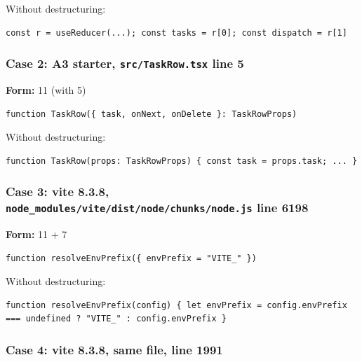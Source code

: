 \documentclass[
  11pt,
]{article}
\begin{document}
Without destructuring:

\begin{lstlisting}
const r = useReducer(...); const tasks = r[0]; const dispatch = r[1]
\end{lstlisting}

\subsubsection{\texorpdfstring{Case 2: A3 starter,
\texttt{src/TaskRow.tsx} line
5}{Case 2: A3 starter, src/TaskRow.tsx line 5}}\label{case-2-a3-starter-srctaskrow.tsx-line-5}

\textbf{Form:} 11 (with 5)

\begin{lstlisting}
function TaskRow({ task, onNext, onDelete }: TaskRowProps)
\end{lstlisting}

Without destructuring:

\begin{lstlisting}
function TaskRow(props: TaskRowProps) { const task = props.task; ... }
\end{lstlisting}

\subsubsection{\texorpdfstring{Case 3: vite 8.3.8,
\texttt{node\_modules/vite/dist/node/chunks/node.js} line
6198}{Case 3: vite 8.3.8, node\_modules/vite/dist/node/chunks/node.js line 6198}}\label{case-3-vite-8.3.8-node_modulesvitedistnodechunksnode.js-line-6198}

\textbf{Form:} 11 + 7

\begin{lstlisting}
function resolveEnvPrefix({ envPrefix = "VITE_" })
\end{lstlisting}

Without destructuring:

\begin{lstlisting}
function resolveEnvPrefix(config) { let envPrefix = config.envPrefix === undefined ? "VITE_" : config.envPrefix }
\end{lstlisting}

\subsubsection{Case 4: vite 8.3.8, same file, line
1991}\label{case-4-vite-8.3.8-same-file-line-1991}
\end{document}
